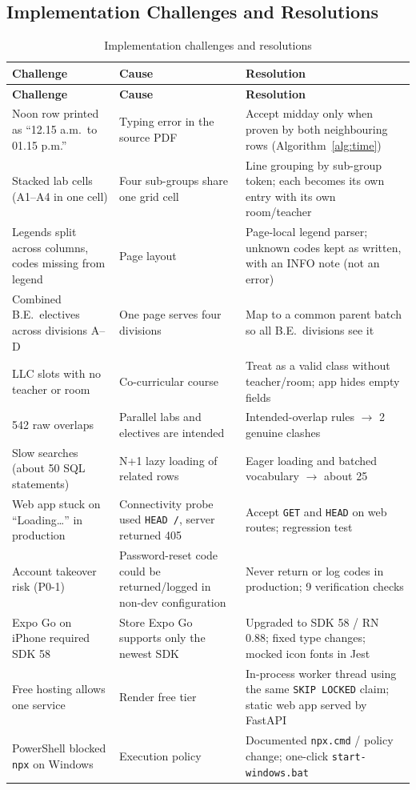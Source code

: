 \subsection{Implementation Challenges and Resolutions}
\begin{longtable}{@{}p{4.2cm}p{4.6cm}p{6.2cm}@{}}
\caption{Implementation challenges and resolutions}\label{tab:challenges}\\
\toprule
\textbf{Challenge} & \textbf{Cause} & \textbf{Resolution}\\
\midrule
\endfirsthead
\toprule
\textbf{Challenge} & \textbf{Cause} & \textbf{Resolution}\\
\midrule
\endhead
Noon row printed as ``12.15 a.m.\ to 01.15 p.m.'' & Typing error in the source PDF & Accept midday only when proven by both neighbouring rows (Algorithm~\ref{alg:time})\\
Stacked lab cells (A1--A4 in one cell) & Four sub-groups share one grid cell & Line grouping by sub-group token; each becomes its own entry with its own room/teacher\\
Legends split across columns, codes missing from legend & Page layout & Page-local legend parser; unknown codes kept as written, with an INFO note (not an error)\\
Combined B.E.\ electives across divisions A--D & One page serves four divisions & Map to a common parent batch so all B.E.\ divisions see it\\
LLC slots with no teacher or room & Co-curricular course & Treat as a valid class without teacher/room; app hides empty fields\\
542 raw overlaps & Parallel labs and electives are intended & Intended-overlap rules $\rightarrow$ 2 genuine clashes\\
Slow searches (about 50 SQL statements) & N+1 lazy loading of related rows & Eager loading and batched vocabulary $\rightarrow$ about 25\\
Web app stuck on ``Loading\ldots'' in production & Connectivity probe used \texttt{HEAD /}, server returned 405 & Accept \texttt{GET} and \texttt{HEAD} on web routes; regression test\\
Account takeover risk (P0-1) & Password-reset code could be returned/logged in non-dev configuration & Never return or log codes in production; 9 verification checks\\
Expo Go on iPhone required SDK 58 & Store Expo Go supports only the newest SDK & Upgraded to SDK 58 / RN 0.88; fixed type changes; mocked icon fonts in Jest\\
Free hosting allows one service & Render free tier & In-process worker thread using the same \texttt{SKIP LOCKED} claim; static web app served by FastAPI\\
PowerShell blocked \texttt{npx} on Windows & Execution policy & Documented \texttt{npx.cmd} / policy change; one-click \texttt{start-windows.bat}\\
\bottomrule
\end{longtable}

\newpage
